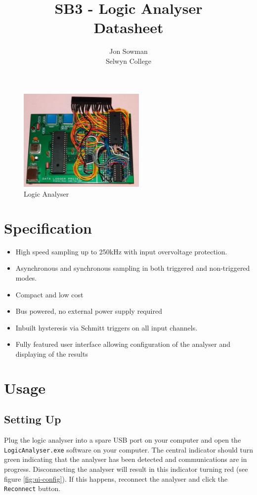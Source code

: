 \documentclass[11pt,twocolumn]{article}
\title{SB3 - Logic Analyser\\Datasheet}
\author{Jon Sowman\\Selwyn College}
\begin{document}
    \maketitle
	
    \begin{figure}
    \centering
    \includegraphics[height=5cm]{../photos/main.jpg}
    \caption{Logic Analyser}
    \label{fig:la}
    \end{figure}

\section{Specification}
    \begin{itemize}
        \item High speed sampling up to 250kHz with input overvoltage
            protection.
        \item Asynchronous and synchronous sampling in both triggered and
            non-triggered modes.
        \item Compact and low cost
        \item Bus powered, no external power supply required
        \item Inbuilt hysteresis via Schmitt triggers on all input channels.
        \item Fully featured user interface allowing configuration of the
            analyser and displaying of the results
    \end{itemize}

\section{Usage}
\subsection{Setting Up}
    Plug the logic analyser into a spare USB port on your computer and open the
    \texttt{LogicAnalyser.exe} software on your computer. The central indicator
    should turn green indicating that the analyser has been detected and
    communications are in progress. Disconnecting the analyser will result in
    this indicator turning red (see figure \ref{fig:ui-config}). 
    If this happens, reconnect the analyser and
    click the \texttt{Reconnect} button.
\end{document}
